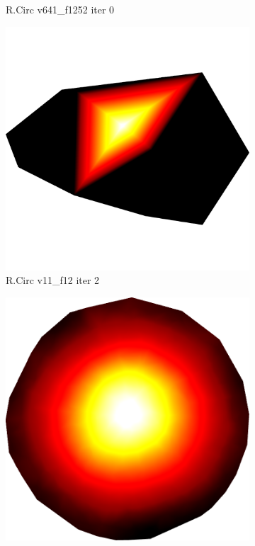 \begin{figure}[ht]
{\begin{subfigure}[b]{0.48\linewidth}
		\caption{R.Circ v641\_f1252 iter 0}\label{fig:rcirc.d}
	\end{subfigure}

	\bigskip
	\begin{subfigure}[b]{0.48\linewidth}
		\includegraphics[width=1.0\linewidth,height=0.3\textheight,keepaspectratio,height=0.3\textheight,keepaspectratio]{data/synthetic_meshes/random_circle_tessellation_Dirac_delta_1_v11_f12_funcvals_0iter.png}
		\caption{R.Circ v11\_f12 iter 2}\label{fig:rcirc.e}
	\end{subfigure}
	\begin{subfigure}[b]{0.48\linewidth}
		\includegraphics[width=1.0\linewidth,height=0.3\textheight,keepaspectratio,height=0.3\textheight,keepaspectratio]{data/synthetic_meshes/random_circle_tessellation_Dirac_delta_10_v641_f1252_funcvals_10000iter.png}

\end{subfigure}}
\end{figure}
